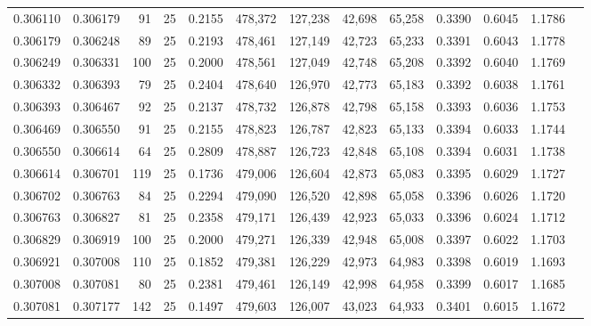 \begin{tabular}{rrrrrrrrrrrrr}
0.306110 & 0.306179 &    91 &  25 &                                     0.2155 & 478,372 & 127,238 &  42,698 &  65,258 & 0.3390 & 0.6045 & 1.1786 \\
0.306179 & 0.306248 &    89 &  25 &                                     0.2193 & 478,461 & 127,149 &  42,723 &  65,233 & 0.3391 & 0.6043 & 1.1778 \\
0.306249 & 0.306331 &   100 &  25 &                                     0.2000 & 478,561 & 127,049 &  42,748 &  65,208 & 0.3392 & 0.6040 & 1.1769 \\
0.306332 & 0.306393 &    79 &  25 &                                     0.2404 & 478,640 & 126,970 &  42,773 &  65,183 & 0.3392 & 0.6038 & 1.1761 \\
0.306393 & 0.306467 &    92 &  25 &                                     0.2137 & 478,732 & 126,878 &  42,798 &  65,158 & 0.3393 & 0.6036 & 1.1753 \\
0.306469 & 0.306550 &    91 &  25 &                                     0.2155 & 478,823 & 126,787 &  42,823 &  65,133 & 0.3394 & 0.6033 & 1.1744 \\
0.306550 & 0.306614 &    64 &  25 &                                     0.2809 & 478,887 & 126,723 &  42,848 &  65,108 & 0.3394 & 0.6031 & 1.1738 \\
0.306614 & 0.306701 &   119 &  25 &                                     0.1736 & 479,006 & 126,604 &  42,873 &  65,083 & 0.3395 & 0.6029 & 1.1727 \\
0.306702 & 0.306763 &    84 &  25 &                                     0.2294 & 479,090 & 126,520 &  42,898 &  65,058 & 0.3396 & 0.6026 & 1.1720 \\
0.306763 & 0.306827 &    81 &  25 &                                     0.2358 & 479,171 & 126,439 &  42,923 &  65,033 & 0.3396 & 0.6024 & 1.1712 \\
0.306829 & 0.306919 &   100 &  25 &                                     0.2000 & 479,271 & 126,339 &  42,948 &  65,008 & 0.3397 & 0.6022 & 1.1703 \\
0.306921 & 0.307008 &   110 &  25 &                                     0.1852 & 479,381 & 126,229 &  42,973 &  64,983 & 0.3398 & 0.6019 & 1.1693 \\
0.307008 & 0.307081 &    80 &  25 &                                     0.2381 & 479,461 & 126,149 &  42,998 &  64,958 & 0.3399 & 0.6017 & 1.1685 \\
0.307081 & 0.307177 &   142 &  25 &                                     0.1497 & 479,603 & 126,007 &  43,023 &  64,933 & 0.3401 & 0.6015 & 1.1672 \\

\end{tabular}
